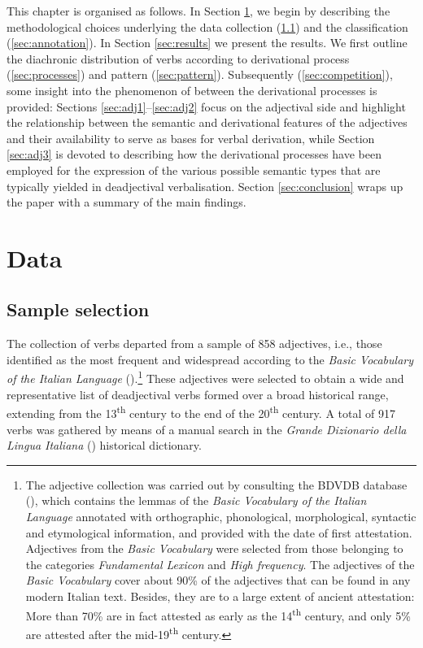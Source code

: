 \documentclass[output=paper,colorlinks,citecolor=brown]{langscibook}
\begin{document}
This chapter is organised as follows. In Section \ref{sec:data}, we begin by describing the methodological choices underlying the data collection (\ref{sec:samples}) and the classification (\ref{sec:annotation}). In Section \ref{sec:results} we present the results. We first outline the diachronic distribution of verbs according to derivational process (\ref{sec:processes}) and pattern (\ref{sec:pattern}). Subsequently (\ref{sec:competition}), some insight into the phenomenon of  between the derivational processes is provided: Sections \ref{sec:adj1}--\ref{sec:adj2} focus on the adjectival side and highlight the relationship between the semantic and derivational features of the adjectives and their availability to serve as bases for verbal derivation, while Section \ref{sec:adj3} is devoted to describing how the derivational processes have been employed for the expression of the various possible semantic types that are typically yielded in deadjectival verbalisation. Section \ref{sec:conclusion} wraps up the paper with a summary of the main findings.

\section{Data}\label{sec:data}
\subsection{Sample selection}\label{sec:samples}

The collection of verbs departed from a sample of 858 adjectives, i.e., those identified as the most frequent and widespread according to the \textit{Basic Vocabulary of the Italian Language} (\citealt{DeMauro1980}).\footnote{The adjective collection was carried out by consulting the BDVDB database (\citealt{ThorntonEtAl1997}), which contains the lemmas of the \textit{Basic Vocabulary of the Italian Language} annotated with orthographic, phonological, morphological, syntactic and etymological information, and provided with the date of first attestation. Adjectives from the \textit{Basic Vocabulary} were selected from those belonging to the categories \textit{Fundamental Lexicon} and \textit{High frequency}. The adjectives of the \textit{Basic Vocabulary} cover about 90\% of the adjectives that can be found in any modern Italian text. Besides, they are to a large extent of ancient attestation: More than 70\% are in fact attested as early as the 14\textsuperscript{th} century, and only 5\% are attested after the mid-19\textsuperscript{th} century.} These adjectives were selected to obtain a wide and representative list of deadjectival verbs formed over a broad historical range, extending from the 13\textsuperscript{th} century to the end of the 20\textsuperscript{th} century. A total of 917 verbs was gathered by means of a manual search in the \textit{Grande Dizionario della Lingua Italiana} () historical dictionary.
\end{document}

